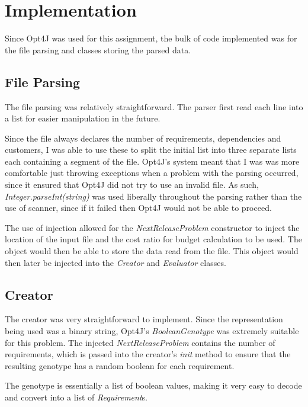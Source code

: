 \documentclass[11pt, a4paper]{article}
\begin{document}
\section{Implementation}
\label{sec:implementation}
Since Opt4J was used for this assignment, the bulk of code implemented was for
the file parsing and classes storing the parsed data.
\subsection{File Parsing} %
\label{sub:file_parsing}
The file parsing was relatively straightforward. The parser first read each line
into a list for easier manipulation in the future.

Since the file always declares the number of requirements, dependencies and
customers, I was able to use these to split the initial list into three separate
lists each containing a segment of the file. Opt4J's system meant that I was
was more comfortable just throwing exceptions when a problem with the parsing
occurred, since it ensured that Opt4J did not try to use an invalid file. As
such, \emph{Integer.parseInt(string)} was used liberally throughout the parsing
rather than the use of scanner, since if it failed then Opt4J would not be able
to proceed.

The use of injection allowed for the \emph{NextReleaseProblem} constructor to
inject the location of the input file and the cost ratio for budget calculation
to be used. The object would then be able to store the data read from the file.
This object would then later be injected into the \emph{Creator} and
\emph{Evaluator} classes.

\subsection{Creator} %
\label{sub:creator}
The creator was very straightforward to implement. Since the representation
being used was a binary string, Opt4J's \emph{BooleanGenotype} was extremely
suitable for this problem. The injected \emph{NextReleaseProblem} contains the
number of requirements, which is passed into the creator's \emph{init} method to
ensure that the resulting genotype has a random boolean for each requirement.

The genotype is essentially a list of boolean values, making it very easy to
decode and convert into a list of \emph{Requirement}s.
\end{document}
